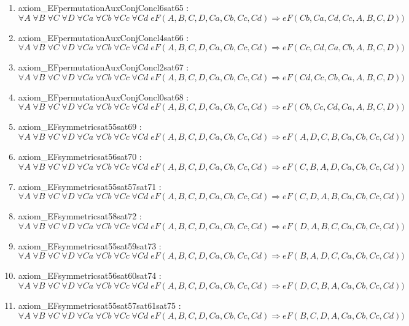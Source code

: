 \documentclass{article}
\begin{document}
\begin{enumerate}
\item axiom\_EFpermutationAuxConjConcl6sat65 : $\forall A\;\forall B\;\forall C\;\forall D\;\forall Ca\;\forall Cb\;\forall Cc\;\forall Cd\;eF(A, B, C, D, Ca, Cb, Cc, Cd) \Rightarrow eF(Cb, Ca, Cd, Cc, A, B, C, D))$
\item axiom\_EFpermutationAuxConjConcl4sat66 : $\forall A\;\forall B\;\forall C\;\forall D\;\forall Ca\;\forall Cb\;\forall Cc\;\forall Cd\;eF(A, B, C, D, Ca, Cb, Cc, Cd) \Rightarrow eF(Cc, Cd, Ca, Cb, A, B, C, D))$
\item axiom\_EFpermutationAuxConjConcl2sat67 : $\forall A\;\forall B\;\forall C\;\forall D\;\forall Ca\;\forall Cb\;\forall Cc\;\forall Cd\;eF(A, B, C, D, Ca, Cb, Cc, Cd) \Rightarrow eF(Cd, Cc, Cb, Ca, A, B, C, D))$
\item axiom\_EFpermutationAuxConjConcl0sat68 : $\forall A\;\forall B\;\forall C\;\forall D\;\forall Ca\;\forall Cb\;\forall Cc\;\forall Cd\;eF(A, B, C, D, Ca, Cb, Cc, Cd) \Rightarrow eF(Cb, Cc, Cd, Ca, A, B, C, D))$
\item axiom\_EFsymmetricsat55sat69 : $\forall A\;\forall B\;\forall C\;\forall D\;\forall Ca\;\forall Cb\;\forall Cc\;\forall Cd\;eF(A, B, C, D, Ca, Cb, Cc, Cd) \Rightarrow eF(A, D, C, B, Ca, Cb, Cc, Cd))$
\item axiom\_EFsymmetricsat56sat70 : $\forall A\;\forall B\;\forall C\;\forall D\;\forall Ca\;\forall Cb\;\forall Cc\;\forall Cd\;eF(A, B, C, D, Ca, Cb, Cc, Cd) \Rightarrow eF(C, B, A, D, Ca, Cb, Cc, Cd))$
\item axiom\_EFsymmetricsat55sat57sat71 : $\forall A\;\forall B\;\forall C\;\forall D\;\forall Ca\;\forall Cb\;\forall Cc\;\forall Cd\;eF(A, B, C, D, Ca, Cb, Cc, Cd) \Rightarrow eF(C, D, A, B, Ca, Cb, Cc, Cd))$
\item axiom\_EFsymmetricsat58sat72 : $\forall A\;\forall B\;\forall C\;\forall D\;\forall Ca\;\forall Cb\;\forall Cc\;\forall Cd\;eF(A, B, C, D, Ca, Cb, Cc, Cd) \Rightarrow eF(D, A, B, C, Ca, Cb, Cc, Cd))$
\item axiom\_EFsymmetricsat55sat59sat73 : $\forall A\;\forall B\;\forall C\;\forall D\;\forall Ca\;\forall Cb\;\forall Cc\;\forall Cd\;eF(A, B, C, D, Ca, Cb, Cc, Cd) \Rightarrow eF(B, A, D, C, Ca, Cb, Cc, Cd))$
\item axiom\_EFsymmetricsat56sat60sat74 : $\forall A\;\forall B\;\forall C\;\forall D\;\forall Ca\;\forall Cb\;\forall Cc\;\forall Cd\;eF(A, B, C, D, Ca, Cb, Cc, Cd) \Rightarrow eF(D, C, B, A, Ca, Cb, Cc, Cd))$
\item axiom\_EFsymmetricsat55sat57sat61sat75 : $\forall A\;\forall B\;\forall C\;\forall D\;\forall Ca\;\forall Cb\;\forall Cc\;\forall Cd\;eF(A, B, C, D, Ca, Cb, Cc, Cd) \Rightarrow eF(B, C, D, A, Ca, Cb, Cc, Cd))$

\end{enumerate}
\end{document}
